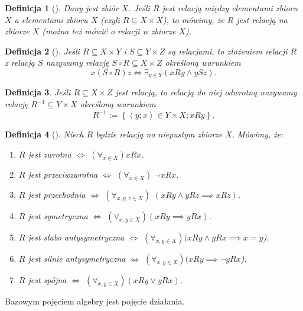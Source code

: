 \documentclass[12pt,a4paper]{report}
\newtheorem{definition}{Definicja}[chapter]
\newcommand{\parauporzadkowana}[2]{\left\langle {#1}; {#2} \right\rangle}
\newcommand{\zbior}[1]{\left\lbrace {#1} \right\rbrace }
\begin{document}
\begin{definition}[\citep{kraszewski2007wstkep}]
Dany jest zbiór $X$. Jeśli $R$ jest relacją między elementami zbioru $X$ a elementami zbioru $X$ (czyli $R\subseteq X \times X$), to mówimy, że $R$ jest relacją na zbiorze $X$ (można też mówić o relacji w zbiorze $X$).
\end{definition}

\begin{definition}[\citep{kraszewski2007wstkep}]
Jeśli $R\subseteq X\times Y$ i $S\subseteq Y \times Z$ są relacjami, to złożeniem relacji $R$ z relacją $S$ nazywamy relację $S\circ R \subseteq X \times Z$ określoną warunkiem
\begin{equation*}
x(S\circ R)z \iff \exists_{y \in Y} (xRy \land ySz).
\end{equation*}
\end{definition}
\begin{definition}
Jeśli $R \subseteq X \times Z$ jest relacją, to relacją do niej odwrotną nazywamy relację $R^{-1} \subseteq Y \times X$ określoną warunkiem 
\begin{equation*}
R^{-1} := \zbior{\parauporzadkowana{y}{x} \in Y \times X; xRy}.
\end{equation*}
\end{definition}

\begin{definition}[\citep{kraszewski2007wstkep}]
Niech $R$ będzie relacją na niepustym zbiorze $X$. Mówimy, że:
\begin{enumerate}
\item
$R$ jest zwrotna $\iff$ $(\forall_{x\in X}) xRx$.
\item
$R$ jest przeciwzwrotna $\iff$ $(\forall_{x\in X})$ $\neg xRx$.
\item
$R$ jest przechodnia $\iff$ $(\forall_{x,y,z\in X})$ $(xRy\land yRz  \implies xRz)$.
\item
$R$ jest symetryczna $\iff$ $(\forall_{x,y\in X})(xRy \implies yRx)$. 
\item
$R$ jest słabo antysymetryczna $\iff$ $(\forall_{x,y\in X})( xRy \land yRx \implies x=y$).
\item
$R$ jest silnie antysymetryczna $\iff$ $(\forall_{x,y\in X})(xRy \implies \neg yRx$).
\item
$R$ jest spójna $\iff$ $(\forall_{x,y\in X})(xRy \lor yRx)$.

\end{enumerate}
\end{definition}
Bazowym pojęciem algebry jest pojęcie działania.
\end{document}
